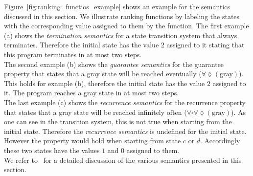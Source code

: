 \documentclass[11pt,a4paper,titlepage]{article}
\theoremstyle{definition}
\begin{document}
Figure~\ref{fig:ranking_functios_example} shows an example for the semantics discussed in this section.
We illustrate ranking functions by labeling the states with the corresponding value assigned to them by the function. 
The first example (a) shows the \textit{termination semantics} for a state transition system that always terminates. Therefore the initial state
has the value $2$ assigned to it stating that this program terminates in at most two steps.\\

The second example (b) shows the \textit{guarantee semantics} for the guarantee property that states that a gray state will be reached eventually 
($\forall\lozenge(\text{gray})$).
This holds for example (b), therefore the initial state has the value $2$ assigned to it. The program reaches a gray state in at most two steps.\\

The last example (c) shows the \textit{recurrence semantics} for the recurrence property that states that a gray state will be reached infinitely often
($\forall\square\forall\lozenge(\text{gray})$).
As one can see in the transition system, this is not true when starting from the initial state. Therefore the \textit{recurrence semantics} is undefined
for the initial state. However the property would hold when starting from state $c$ or $d$. 
Accordingly these two states have the values $1$ and $0$ assigned to them.\\

We refer to~\cite{UrbanPhd} for a detailed discussion of the various semantics presented in this section.
\end{document}
